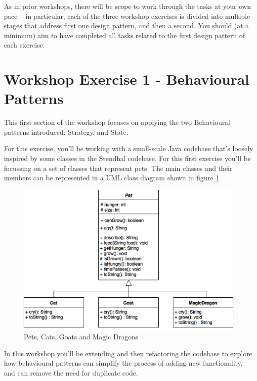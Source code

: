 \documentclass[
]{book}
\begin{document}
As in prior workshops, there will be scope to work through the tasks at your own pace -- in particular, each of the three workshop exercises is divided into multiple stages that address first one design pattern, and then a second. You should (at a minimum) aim to have completed all tasks related to the first design pattern of each exercise.

\hypertarget{behave}{%
\section{Workshop Exercise 1 - Behavioural Patterns}\label{behave}}

This first section of the workshop focuses on applying the two Behavioural patterns introduced: Strategy, and State.

For this exercise, you'll be working with a small-scale Java codebase that's loosely inspired by some classes in the Stendhal codebase. For this first exercise you'll be focussing on a set of classes that represent pets. The main classes and their members can be represented in a UML class diagram shown in figure \ref{fig:basicpets-fig}

\begin{figure}

{\centering \includegraphics[width=1\linewidth]{images/BasicPets} 

}

\caption{Pets, Cats, Goats and Magic Dragons}\label{fig:basicpets-fig}
\end{figure}

In this workshop you'll be extending and then refactoring the codebase to explore how behavioural patterns can simplify the process of adding new functionality, and can remove the need for duplicate code.
\end{document}

